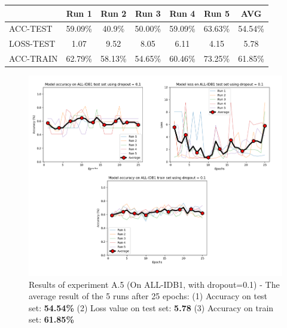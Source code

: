 \documentclass[11pt, openany]{report}
\theoremstyle{plain}
\theoremstyle{definition}
\theoremstyle{remark}
\begin{document}
\begin{center}
\begin{tabular}{|l|c|c|c|c|c|c|}
  \hline
   & \textbf{Run 1} & \textbf{Run 2} & \textbf{Run 3} & \textbf{Run 4} & \textbf{Run 5} & \textbf{AVG}\\
  \hline
  ACC-TEST & 59.09\% & 40.9\% & 50.00\% & 59.09\% & 63.63\% & 54.54\% \\
  LOSS-TEST & 1.07 & 9.52 & 8.05 & 6.11  & 4.15 & 5.78 \\ 
  ACC-TRAIN & 62.79\% & 58.13\% & 54.65\% & 60.46\% & 73.25\% & 61.85\% \\ 
  \hline
\end{tabular}
\label{table:results-A5}
\end{center}


\begin{figure}[H]
  \centering
  \includegraphics[scale=0.4]{Code/ch6-LeukemiaSubtypes/figures_result/ALL_IDB1/all_idb1-dropout.PNG}
  \caption{Results of experiment A.5 (On ALL-IDB1, with dropout=0.1) - The average result of the 5 runs after 25 epochs: (1) Accuracy on test set: \textbf{54.54\%} (2) Loss value on test set: \textbf{5.78} (3) Accuracy on train set: \textbf{61.85\%}}
  \label{fig:results-A5}
\end{figure}
\end{document}
